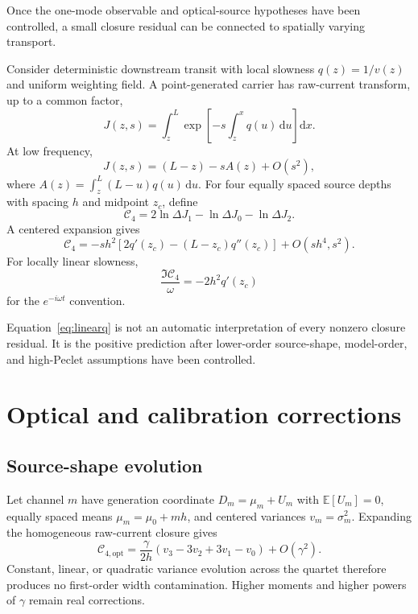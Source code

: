 \documentclass[11pt]{article}
\newcommand{\Cfour}{\mathcal{C}_4}
\newcommand{\E}{\mathbb{E}}
\newcommand{\dd}{\mathrm{d}}
\begin{document}
Once the one-mode observable and optical-source hypotheses have been controlled, a small closure residual can be connected to spatially varying transport.

Consider deterministic downstream transit with local slowness $q(z)=1/v(z)$ and uniform weighting field. A point-generated carrier has raw-current transform, up to a common factor,
\begin{equation}
J(z,s)=\int_z^L
\exp\left[-s\int_z^x q(u)\,\dd u\right]\dd x.
\label{eq:Jvarying}
\end{equation}
At low frequency,
\begin{equation}
J(z,s)=(L-z)-sA(z)+O(s^2),
\end{equation}
where $A(z)=\int_z^L(L-u)q(u)\,\dd u$. For four equally spaced source depths with spacing $h$ and midpoint $z_c$, define
\begin{equation}
\Cfour=2\ln\Delta J_1-\ln\Delta J_0-\ln\Delta J_2.
\end{equation}
A centered expansion gives
\begin{equation}
\boxed{
\Cfour=-s h^2\left[2q'(z_c)-(L-z_c)q''(z_c)\right]
+O(sh^4,s^2).}
\label{eq:gradienttheorem}
\end{equation}
For locally linear slowness,
\begin{equation}
\boxed{
\frac{\Im\Cfour}{\omega}=-2h^2q'(z_c)}
\label{eq:linearq}
\end{equation}
for the $e^{-i\omega t}$ convention.

Equation~\eqref{eq:linearq} is not an automatic interpretation of every nonzero closure residual. It is the positive prediction after lower-order source-shape, model-order, and high-Peclet assumptions have been controlled.

\section{Optical and calibration corrections}

\subsection{Source-shape evolution}

Let channel $m$ have generation coordinate $D_m=\mu_m+U_m$ with $\E[U_m]=0$, equally spaced means $\mu_m=\mu_0+mh$, and centered variances $v_m=\sigma_m^2$. Expanding the homogeneous raw-current closure gives
\begin{equation}
\boxed{
\mathcal{C}_{4,\mathrm{opt}}
=\frac{\gamma}{2h}(v_3-3v_2+3v_1-v_0)+O(\gamma^2).}
\label{eq:opticalerror}
\end{equation}
Constant, linear, or quadratic variance evolution across the quartet therefore produces no first-order width contamination. Higher moments and higher powers of $\gamma$ remain real corrections.
\end{document}
